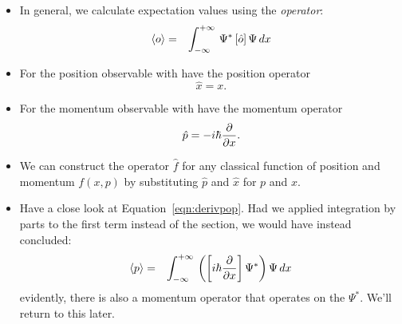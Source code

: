 \documentclass[12pt]{book}
\begin{document}
\begin{itemize}
\item In general, we calculate expectation values using the {\em operator}:
\begin{eqnarray}
\braket{o}  &=& \int_{-\infty}^{+\infty} \, \Psi^* \left[ \hat{o} \right] \Psi \,dx 
\end{eqnarray}
\item For the position observable with have the position operator 
\begin{equation}
\hat{x} = x.
\end{equation}
\item For the momentum observable with have the momentum operator 
\begin{equation}
\hat{p} = - i \hbar \frac{\partial}{\partial x}.
\end{equation}
\item We can construct the operator $\hat{f}$ for any classical function of position and momentum $f(x,p)$ by substituting $\hat{p}$ and $\hat{x}$ for $p$ and $x$.
\item Have a close look at Equation~\ref{eqn:derivpop}.  Had we applied integration by parts to the first term instead of the section, we would have instead concluded:
\begin{eqnarray*}
\braket{p} &=&  
\int_{-\infty}^{+\infty} \, \left(\left[ i \hbar \frac{\partial}{\partial x}\right] \Psi^* \right) \Psi\,dx 
\end{eqnarray*}
evidently, there is also a momentum operator that operates on the $\Psi^*$.  We'll return to this later.
\end{itemize}
\end{document}
